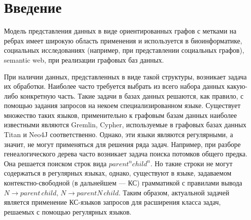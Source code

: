 \documentclass[14pt]{matmex-diploma-custom}
\begin{document}
\maketitle
\tableofcontents

\section*{Введение}
	Модель представления данных в виде ориентированных графов с метками на ребрах имеет широкую область применения и используется в биоинформатике, социальных исследованиях (например, при представлении социальных графов), semantic web, при реализации графовых баз данных. 
	
	При наличии данных, представленных в виде такой структуры, возникает задача их обработки. Наиболее часто требуется выбрать из всего набора данных какую-либо конкретную часть. Такие задачи в базах данных решаются, как правило, с помощью задания запросов на некоем специализированном языке. Существует множество таких языков, применительно к графовым базам данных наиболее известными являются Gremlin\cite{Gremlin}, Cypher\cite{Cypher}, используемые в графовых базах данных Titan и Neo4J соответственно. Однако, эти языки являются регулярными, а значит, не могут применяться для решения ряда задач. Например, при разборе генеалогического дерева часто возникает задача поиска потомков общего предка. Она решается поиском строк вида \(parent^nchild^n\). Но такие строки не могут содержаться в регулярных языках, однако, существуют в языке, задаваемом контекстно-свободной (в дальнейшем --- КС) грамматикой с правилами вывода \(N \to parent\,child, \,N \to parentN\, child\). Таким образом, актуальной задачей является применение КС-языков запросов для расширения класса задач, решаемых с помощью регулярных языков. 
	
\end{document}
